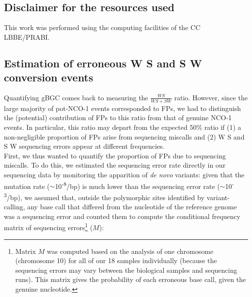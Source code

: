 \subsection{Disclaimer for the resources used}

This work was performed using the computing facilities of the CC LBBE/PRABI\@.


\subsection{Estimation of erroneous W\textrightarrow{} S and S\textrightarrow{} W conversion events}

Quantifying gBGC comes back to measuring the $\frac{WS}{WS+SW}$ ratio.
However, since the large majority of pot-NCO-1 events corresponded to FPs, we had to distinguish the (potential) contribution of FPs to this ratio from that of genuine NCO-1 events.
In particular, this ratio may depart from the expected 50\% ratio if (1) a non-negligible proportion of FPs arise from sequencing miscalls and (2) W\textrightarrow{} S and S\textrightarrow{} W sequencing errors appear at different frequencies.\\

First, we thus wanted to quantify the proportion of FPs due to sequencing miscalls.
To do this, we estimated the sequencing error rate directly in our sequencing data by monitoring the apparition of \textit{de novo} variants:
given that the mutation rate ($\sim$10\textsuperscript{-8}/bp) is much lower than the sequencing error rate ($\sim$10\textsuperscript{-3}/bp), we assumed that, outside the polymorphic sites identified by variant-calling, any base call that differed from the nucleotide of the reference genome was a sequencing error and counted them to compute the conditional frequency matrix of sequencing errors\footnote{Matrix $M$ was computed based on the analysis of one chromosome (chromosome 10) for all of our 18 samples individually (because the sequencing errors may vary between the biological samples and sequencing runs). This matrix gives the probability of each erroneous base call, given the genuine nucleotide.} ($M$):

